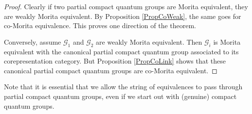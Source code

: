\begin{proof} Clearly if two partial compact quantum groups are Morita equivalent, they are weakly Morita equivalent. By Proposition \ref{PropCoWeak}, the same goes for co-Morita equivalence. This proves one direction of the theorem. 

Conversely, assume $\mathscr{G}_1$ and $\mathscr{G}_2$ are weakly Morita equivalent. Then $\mathscr{G}_i$ is Morita equivalent with the canonical partial compact quantum group associated to its corepresentation category. But Proposition \ref{PropCoLink} shows that these canonical partial compact quantum groups are co-Morita equivalent. 
\end{proof} 

\begin{Rem} Note that it is essential that we allow the string of equivalences to pass through partial compact quantum groups, even if we start out with (genuine) compact quantum groups.\end{Rem}







